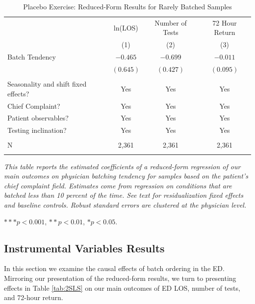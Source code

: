 \documentclass[,,nonblindrev]{informs}
\begin{document}
\begin{table}[htbp]
\centering
\caption{Placebo Exercise: Reduced-Form Results for Rarely Batched Samples}
\label{tab:placebo_check}
\begin{tabular}{p{8cm}ccc}
\toprule
& ln(LOS) & Number of Tests & 72 Hour Return \\ 
& (1) & (2) & (3) \\
\midrule
Batch Tendency & $-0.465$ & $-0.699$ & $-0.011$ \\
& $(0.645)$ & $(0.427)$ & $(0.095)$ \\
                    &     &     &  \\
Seasonality and shift fixed effects? & Yes & Yes & Yes \\
Chief Complaint? & Yes & Yes & Yes \\
Patient observables? & Yes & Yes & Yes \\
Testing inclination? & Yes & Yes & Yes \\
                    &     &     &  \\
N & 2,361 & 2,361 & 2,361 \\
\addlinespace
\midrule
\bottomrule
\end{tabular}
\begin{tablenotes}
\tiny
\item \textit{This table reports the estimated coefficients of a reduced-form regression of our main outcomes on physician batching tendency for samples based on the patient’s chief complaint field. Estimates come from regression on conditions that are batched less than 10 percent of the time. See text for residualization fixed effects and baseline controls. Robust standard errors are clustered at the physician level.}
\item $*** p < 0.001$, $** p < 0.01$, $* p < 0.05$.
\end{tablenotes}
\end{table}

\hypertarget{instrumental-variables-results}{%
\subsection{Instrumental Variables
Results}\label{instrumental-variables-results}}

In this section we examine the causal effects of batch ordering in the
ED. Mirroring our presentation of the reduced-form results, we turn to
presenting effects in Table \ref{tab:2SLS} on our main outcomes of ED
LOS, number of tests, and 72-hour return.
\end{document}
